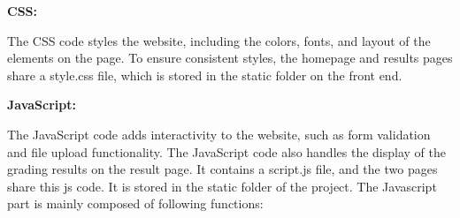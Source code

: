 \documentclass[twocolumn]{article}
\begin{document}
        \textbf{CSS:} 
        
        The CSS code styles the website, including the colors, fonts, and layout of the elements on the page. To ensure consistent styles, the homepage and results pages share a style.css file, which is stored in the static folder on the front end.
        
        \textbf{JavaScript:} 
        
        The JavaScript code adds interactivity to the website, such as form validation and file upload functionality. The JavaScript code also handles the display of the grading results on the result page. It contains a script.js file, and the two pages share this js code. It is stored in the static folder of the project. The Javascript part is mainly composed of following functions:
\end{document}
